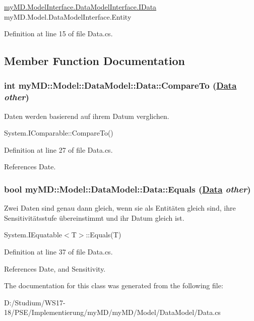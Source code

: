 \hyperlink{interfacemy_m_d_1_1_model_interface_1_1_data_model_interface_1_1_i_data}{my\-MD.Model\-Interface.Data\-Model\-Interface.IData} my\-MD.Model.Data\-Model\-Interface.Entity 



Definition at line 15 of file Data.cs.

\subsection{Member Function Documentation}
\hypertarget{classmy_m_d_1_1_model_1_1_data_model_1_1_data_4f2ddc0c8daaf94fefc04ccaff963d0f}{
\subsubsection[CompareTo]{\setlength{\rightskip}{0pt plus 5cm}int my\-MD::Model::Data\-Model::Data::Compare\-To (\hyperlink{classmy_m_d_1_1_model_1_1_data_model_1_1_data}{Data} {\em other})}}
\label{db/dac/classmy_m_d_1_1_model_1_1_data_model_1_1_data_4f2ddc0c8daaf94fefc04ccaff963d0f}


Daten werden basierend auf ihrem Datum verglichen. 

System.IComparable::Compare\-To() 

Definition at line 27 of file Data.cs.

References Date.\hypertarget{classmy_m_d_1_1_model_1_1_data_model_1_1_data_84b8ad0a281b10efd1ac00b24c3f4f2a}{
\subsubsection[Equals]{\setlength{\rightskip}{0pt plus 5cm}bool my\-MD::Model::Data\-Model::Data::Equals (\hyperlink{classmy_m_d_1_1_model_1_1_data_model_1_1_data}{Data} {\em other})}}
\label{db/dac/classmy_m_d_1_1_model_1_1_data_model_1_1_data_84b8ad0a281b10efd1ac00b24c3f4f2a}


Zwei Daten sind genau dann gleich, wenn sie als Entit\"{a}ten gleich sind, ihre Sensitivit\"{a}tsstufe \"{u}bereinstimmt und ihr Datum gleich ist. 

System.IEquatable$<$T$>$::Equals(T) 

Definition at line 37 of file Data.cs.

References Date, and Sensitivity.

The documentation for this class was generated from the following file:\begin{CompactItemize}
\item 
D:/Studium/WS17-18/PSE/Implementierung/my\-MD/my\-MD/Model/Data\-Model/Data.cs\end{CompactItemize}
